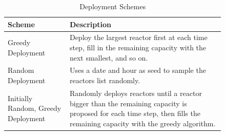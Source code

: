 \documentclass{anstrans}
\begin{document}
\begin{table}[H]
  \centering
  \caption{Deployment Schemes}
  \label{tab:deployment_schemes}
  \begin{tabular}{p{0.24\linewidth} p{0.60\linewidth}}
      \hline
      Scheme & Description \\
      \hline
      Greedy Deployment & Deploy the largest
      reactor first at each time step, fill in the remaining capacity with
      the next smallest, and so on. \\
      Random Deployment & Uses a date and hour as seed to sample the
      reactors list randomly. \\
      Initially Random, Greedy Deployment & Randomly deploys reactors until
      a reactor bigger than the remaining capacity is proposed for each time step,
      then fills the remaining capacity with the greedy algorithm. \\
      \hline
  \end{tabular}
\end{table}



\end{document}
